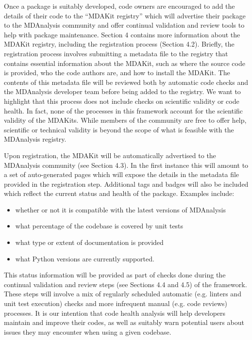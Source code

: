 \documentclass{article}
\begin{document}
Once a package is suitably developed, code owners are encouraged to add the details of their code to the “MDAKit registry” which will advertise their package to the MDAnalysis community and offer continual validation and review tools to help with package maintenance. Section 4 contains more information about the MDAKit registry, including the registration process (Section 4.2). Briefly, the registration process involves submitting a metadata file to the registry that contains essential information about the MDAKit, such as where the source code is provided, who the code authors are, and how to install the MDAKit. The contents of this metadata file will be reviewed both by automatic code checks and the MDAnalysis developer team before being  added to the registry. We want to highlight  that this process does not include checks on scientific validity or code health. In fact, none of the processes in this framework account for the scientific validity of the MDAKits. While members of the community are free to offer help, scientific or technical validity is beyond the scope of what is feasible with the MDAnalysis registry.

Upon registration, the MDAKit will be automatically advertised to the MDAnalysis community (see Section 4.3). In the first instance this will amount to a set of auto-generated pages which will expose the details in the metadata file provided in the registration step. Additional tags and badges will also be included which reflect the current status and health of the package. Examples include:
\begin{itemize}
    \item whether or not it is compatible with the latest versions of MDAnalysis
    \item what percentage of the codebase is covered by unit tests
    \item what type or extent of documentation is provided
    \item what Python versions are currently supported.
\end{itemize}

This status information will be provided as part of checks done during the continual validation and review steps (see Sections 4.4 and 4.5) of the framework. These steps will involve a mix of regularly scheduled automatic (e.g. linters and unit test execution) checks and more infrequent manual (e.g. code reviews) processes. It is our intention that code health analysis will help developers maintain and improve their codes, as well as suitably warn potential users about issues they may encounter when using a given codebase.
\end{document}

